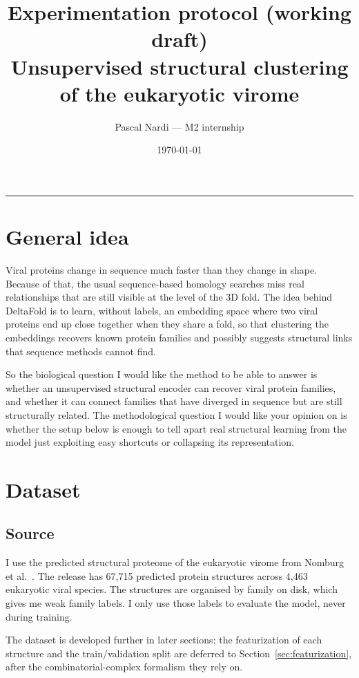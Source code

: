 \documentclass[11pt,a4paper]{article}
\title{Experimentation protocol (working draft)\\[2pt]
\large Unsupervised structural clustering of the eukaryotic virome}
\author{Pascal Nardi --- M2 internship}
\date{\today}
\theoremstyle{definition}
\begin{document}
\maketitle

\tableofcontents
\vspace{4pt}
\hrule

\section{General idea}

Viral proteins change in sequence much faster than they change in shape. Because
of that, the usual sequence-based homology searches miss real relationships that
are still visible at the level of the 3D fold. The idea behind DeltaFold is to
learn, without labels, an embedding space where two viral proteins end up close
together when they share a fold, so that clustering the embeddings recovers known
protein families and possibly suggests structural links that sequence methods
cannot find.

So the biological question I would like the method to be able to answer is
whether an unsupervised structural encoder can recover viral protein families,
and whether it can connect families that have diverged in sequence but are still
structurally related. The methodological question I would like your opinion on is
whether the setup below is enough to tell apart real structural learning from the
model just exploiting easy shortcuts or collapsing its representation.

\section{Dataset}

\subsection{Source}

I use the predicted structural proteome of the eukaryotic virome from Nomburg et
al.~\cite{nomburg2024}. The release has 67,715 predicted protein structures
across 4,463 eukaryotic viral species. The structures are organised by family on
disk, which gives me weak family labels. I only use those labels to evaluate the
model, never during training.

The dataset is developed further in later sections; the featurization of each
structure and the train/validation split are deferred to
Section~\ref{sec:featurization}, after the combinatorial-complex formalism they
rely on.
\end{document}
